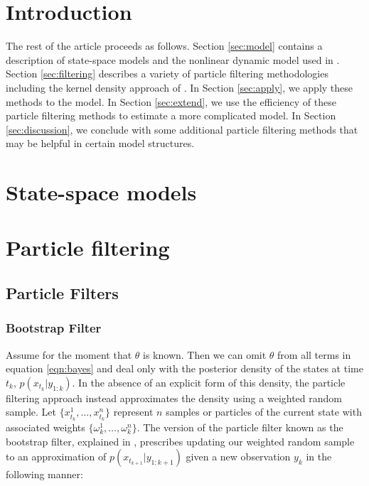 \documentclass{article}
\begin{document}
\section{Introduction}

The rest of the article proceeds as follows. Section \ref{sec:model} contains a description of state-space models and the nonlinear dynamic model used in \citet{skvortsov}. Section \ref{sec:filtering} describes a variety of particle filtering methodologies including the kernel density approach of \cite{Liu:West:comb:2001}. In Section \ref{sec:apply}, we apply these methods to the \citet{skvortsov} model. In Section \ref{sec:extend}, we use the efficiency of these particle filtering methods to estimate a more complicated model. In Section \ref{sec:discussion}, we conclude with some additional particle filtering methods that may be helpful in certain model structures.

\section{State-space models \label{sec:model}}

\section{Particle filtering \label{sec:filtering}}

\subsection{Particle Filters}

\subsubsection{Bootstrap Filter}

Assume for the moment that $\theta$ is known.  Then we can omit $\theta$ from all terms in equation \eqref{eqn:bayes} and deal only with the posterior density of the states at time $t_k$, $p(x_{t_k}|y_{1:k})$.  In the absence of an explicit form of this density, the particle filtering approach instead approximates the density using a weighted random sample.  Let $\{x_{t_k}^1,\ldots,x_{t_k}^n\}$ represent $n$ samples or particles of the current state with associated weights $\{\omega_k^1,\ldots,\omega_k^n\}$.  The version of the particle filter known as the bootstrap filter, explained in \citet{gordon}, prescribes updating our weighted random sample to an approximation of $p(x_{t_{k+1}}|y_{1:k+1})$ given a new observation $y_k$ in the following manner:
\end{document}
